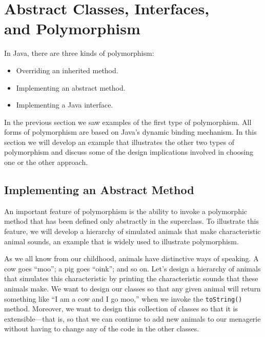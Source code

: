      \section{Abstract Classes, Interfaces, \\ and Polymorphism}

In Java, there are three kinds of polymorphism:

\begin{itemize}
\item Overriding an inherited method.
\item Implementing an abstract method.
\item Implementing a Java interface.
\end{itemize}

\noindent In the previous section we saw examples of the first type of
polymorphism.  All forms of polymorphism are based on Java's dynamic
binding mechanism. In this section we will develop an example that
illustrates the other two types of polymorphism and discuss some of
the design implications involved in choosing one or the other
approach.

\subsection{Implementing an Abstract Method}

An important feature of polymorphism is the ability to invoke a
polymorphic method that has been defined only abstractly in the
superclass. To illustrate this feature, we will develop a hierarchy of
simulated animals that make characteristic animal sounds, an example
that is widely used to illustrate polymorphism.

As we all know from our childhood, animals have distinctive ways of
speaking. A cow goes ``moo''; a pig goes ``oink''; and so on.  Let's
design a hierarchy of animals that simulates this characteristic by
printing the characteristic sounds that these animals make.  We want
to design our classes so that any given animal will return something
like ``I am a cow and I go moo,'' when we invoke the {\tt toString()}
method.  Moreover, we want to design this collection of classes so
that it is extensible---that is, so that we can continue to add new
animals to our menagerie without having to change any of the code in
the other classes.


